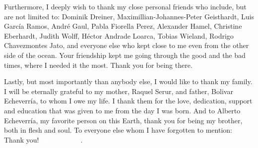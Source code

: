 \begin{changemargin}{-0.3cm}{-0.3cm}
Furthermore, I deeply wish to thank my close personal friends who include, but
are not limited to: Dominik Dreiner, Maximillian-Johannes-Peter Geisthardt, Luis Garc{\'i}a Ramos, Andr{\'e} Gaul, Pabla Fiorella Perez, Alexander Hamel, Christine Eberhardt, Judith Wolff, H{\'e}ctor Andrade Loarca, Tobias Wieland, Rodrigo Chavezmontes Jato, and everyone else who kept close to me even from the other side of the ocean. Your friendship kept me going through the good and the bad times, where I needed it the most. Thank you for being there.

Lastly, but most importantly than anybody else, I would like to thank my family. I will be eternally grateful to my mother, Raquel Serur, and father, Bolivar Echeverr{\'i}a, to whom I owe my life. I thank them for the love, dedication, support and education that was given to me from the day I was born. And to Alberto Echeverr{\'i}a, my favorite person on this Earth, thank you for being my brother, both in flesh and soul.\linebreak
\indent To everyone else whom I have forgotten to mention: Thank you! \textcolor{white}{I love you all}.\pagebreak
\end{changemargin}
\afterpage{\blankpage}
